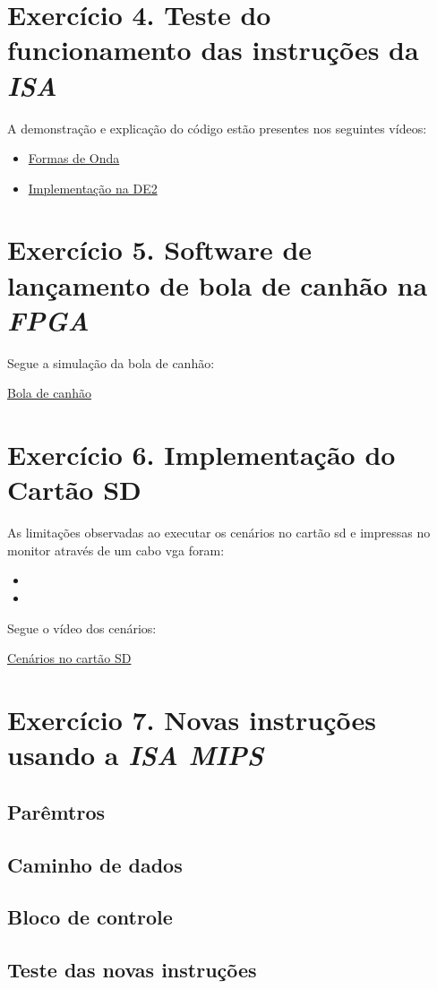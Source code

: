 \documentclass[12pt]{article}
\begin{document}
\section{Exercício 4. Teste do funcionamento das instruções da \textit{ISA} }
\label{sec:testeisa}

A demonstração e explicação do código estão presentes nos seguintes vídeos:

\begin{itemize}
\item \href{https://youtu.be/u5eFv9_BDSw}{Formas de Onda}
\item \href{https://youtu.be/PA9af2_Dhi4}{Implementação na DE2} 
\end{itemize}


\section{Exercício 5. Software de lançamento de bola de canhão na \textit{FPGA}}
\label{sec:canhao}

Segue a simulação da bola de canhão:

\href{https://youtu.be/4IZcH5GzhVk}{Bola de canhão}


\section{Exercício 6. Implementação do Cartão SD}
\label{sec:cartaosd}

As limitações observadas ao executar os cenários no cartão sd e impressas no monitor através de um cabo vga foram:

\begin{itemize}
\item 
\item 
\end{itemize} 

Segue o vídeo dos cenários:

\href{https://youtu.be/VeoxltP3L6o}{Cenários no cartão SD}

  
\section{Exercício 7. Novas instruções usando a \textit{ISA MIPS}}
\label{sec:isamips} 

\subsection{Parêmtros}
\label{subsec:param}


\subsection{Caminho de dados}
\label{subsec:datapath}


\subsection{Bloco de controle}
\label{subsec:control}


\subsection{Teste das novas instruções}
\label{subsec:testeisa}




\end{document}
